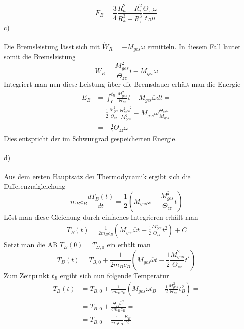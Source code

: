 \[
	F_B = \frac{3}{4}\frac{R_a^2 - R_i^2}{R_a^3 - R_i^3}\frac{\Theta_{zz}\overline{\omega}}{t_B\mu}
\]
c) \\ \\
Die Bremsleistung lässt sich mit $\dot{W}_R = -M_{ges}\omega$ ermitteln. In diesem Fall lautet somit die Bremsleistung
\[
	\dot{W}_R = \frac{M_{ges}^2}{\Theta_{zz}}t - M_{ges}\overline{\omega}
\]
Integriert man nun diese Leistung über die Bremsdauer erhält man die Energie
\begin{align*}
	E_B &= \int_{0}^{t_B}\frac{M_{ges}^2}{\Theta_{zz}}t - M_{ges}\overline{\omega} dt = \\
	&= \frac{1}{2}\frac{M_{ges}^2}{\Theta_{zz}}\frac{\Theta_{zz}^2\overline{\omega}^2}{M_{ges}^2} - M_{ges}\overline{\omega}\frac{\Theta_{zz}\overline{\omega}}{M_{ges}} \\
	&= -\frac{1}{2}\Theta_{zz}\overline{\omega}
\end{align*}
Dies entspricht der im Schwungrad gespeicherten Energie.\\ \\
d) \\ \\
Aus dem ersten Hauptsatz der Thermodynamik ergibt sich die Differenzialgleichung 
\[
	m_Bc_B\frac{dT_B(t)}{dt} = \frac{1}{2}\left(M_{ges}\overline{\omega} - \frac{M_{ges}^2}{\Theta_{zz}}t\right)
\]
Löst man diese Gleichung durch einfaches Integrieren erhält man
\begin{align*}
	T_B(t) = \frac{1}{2m_Bc_B}\left(M_{ges}\overline{\omega}t - \frac{1}{2}\frac{M_{ges}^2}{\Theta_{zz}}t^2\right) + C
\end{align*}
Setzt man die AB $T_B(0) = T_{B,0}$ ein erhält man
\[
	T_B(t) = T_{B,0} + \frac{1}{2m_Bc_B}\left(M_{ges}\overline{\omega}t - \frac{1}{2}\frac{M_{ges}^2}{\Theta_{zz}}t^2\right)
\]
Zum Zeitpunkt $t_B$ ergibt sich nun folgende Temperatur
\begin{align*}
		T_B(t) &= T_{B,0} + \frac{1}{2m_Bc_B}\left(M_{ges}\overline{\omega}t_B - \frac{1}{2}\frac{M_{ges}^2}{\Theta_{zz}}t_B^2\right) = \\
		&= T_{B,0} + \frac{\Theta_{zz}\overline{\omega}^2}{4m_Bc_B} = \\
		&= T_{B,0} - \frac{1}{m_Bc_B}\frac{E_B}{2} 
\end{align*}